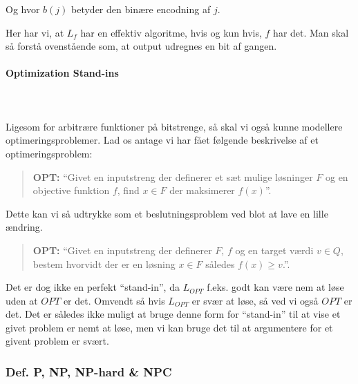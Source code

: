 Og hvor $b(j)$ betyder den binære encodning af $j$. 

Her har vi, at $L_f$ har en effektiv algoritme, hvis og kun hvis, $f$ har det. Man skal så forstå ovenstående som, at output udregnes en bit af gangen.

\paragraph{Optimization Stand-ins}
~\\
~\\
Ligesom for arbitrære funktioner på bitstrenge, så skal vi også kunne modellere optimeringsproblemer. Lad os antage vi har fået følgende beskrivelse af et optimeringsproblem:

\begin{quotation}
 \textbf{OPT:} ``Givet en inputstreng der definerer et sæt mulige løsninger $F$ og en objective funktion $f$, find $x \in F$ der maksimerer $f(x)$''.
\end{quotation}

Dette kan vi så udtrykke som et beslutningsproblem ved blot at lave en lille ændring.

\begin{quotation}
 \textbf{OPT:} ``Givet en inputstreng der definerer $F$, $f$ og en target værdi $v \in Q$, bestem hvorvidt der er en løsning $x \in F$ således $f(x) \geq v$.''.
\end{quotation}

Det er dog ikke en perfekt ``stand-in'', da $L_{OPT}$ f.eks. godt kan være nem at løse uden at $OPT$ er det. Omvendt så hvis $L_{OPT}$ er svær at løse, så ved vi også $OPT$ er det. Det er således ikke muligt at bruge denne form for ``stand-in'' til at vise et givet problem er nemt at løse, men vi kan bruge det til at argumentere for et givent problem er svært.


\subsubsection{Def. P, NP, NP-hard \& NPC}

